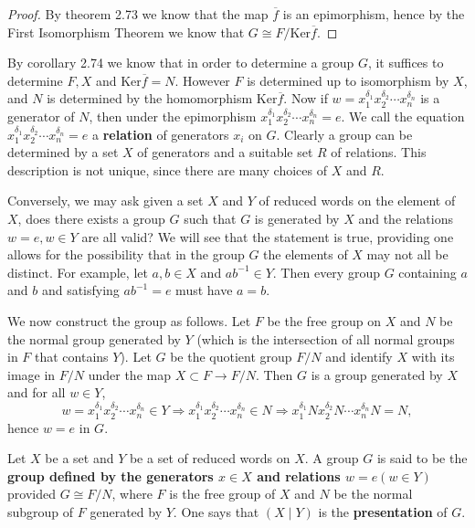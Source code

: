 \begin{proof}
By theorem 2.73 we know that the map $\overline{f}$ is an epimorphism, hence by the First Isomorphism Theorem we know that $G\cong F/\mathrm{Ker}\overline{f}$.
\end{proof}
By corollary 2.74 we know that in order to determine a group $G$, it suffices to determine $F,X$ and $\mathrm{Ker}\overline{f}=N$. However $F$ is determined up to isomorphism by $X$, and $N$ is determined by the homomorphism $\mathrm{Ker}\overline{f}$. Now if $w=x_1^{\delta_1}x_2^{\delta_2}\cdots x_n^{\delta_n}$ is a generator of $N$, then under the epimorphism $x_1^{\delta_1}x_2^{\delta_2}\cdots x_n^{\delta_n}=e$. We call the equation $x_1^{\delta_1}x_2^{\delta_2}\cdots x_n^{\delta_n}=e$ a \textbf{relation} of generators $x_i$ on $G$. Clearly a group can be determined by a set $X$ of generators and a suitable set $R$ of relations. This description is not unique, since there are many choices of $X$ and $R$.\par
Conversely, we may ask given a set $X$ and $Y$ of reduced words on the element of $X$, does there exists a group $G$ such that $G$ is generated by $X$ and the relations $w=e,w\in Y$ are all valid? We will see that the statement is true, providing one allows for the possibility that in the group $G$ the elements of $X$ may not all be distinct. For example, let $a,b\in X$ and $ab^{-1}\in Y$. Then every group $G$ containing $a$ and $b$ and satisfying $ab^{-1}=e$ must have $a=b$.\par
We now construct the group as follows. Let $F$ be the free group on $X$ and $N$ be the normal group generated by $Y$ (which is the intersection of all normal groups in $F$ that contains $Y$). Let $G$ be the quotient group $F/N$ and identify $X$ with its image in $F/N$ under the map $X\subset F\to F/N$. Then $G$ is a group generated by $X$ and for all $w\in Y$, 
$$
w=x_{1}^{\delta _1}x_{2}^{\delta _2}\cdots x_{n}^{\delta _n}\in Y\Rightarrow x_{1}^{\delta _1}x_{2}^{\delta _2}\cdots x_{n}^{\delta _n}\in N\Rightarrow x_{1}^{\delta _1}Nx_{2}^{\delta _2}N\cdots x_{n}^{\delta _n}N=N,
$$
hence $w=e$ in $G$.\par
\begin{definition}
Let $X$ be a set and $Y$ be a set of reduced words on $X$. A group $G$ is said to be the \textbf{group defined by the generators $x\in X$ and relations $w=e(w\in Y)$} provided $G\cong F/N$, where $F$ is the free group of $X$ and $N$ be the normal subgroup of $F$ generated by $Y$. One says that $(X\mid Y)$ is the \textbf{presentation} of $G$.
\end{definition}
